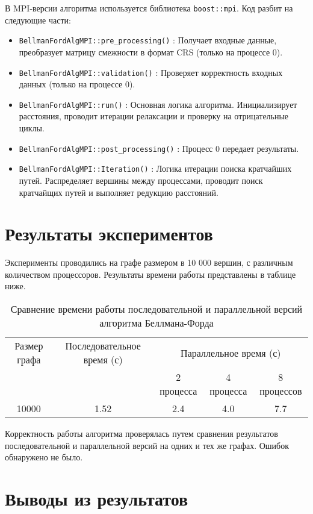 \documentclass[12pt]{article}
\begin{document}
В MPI-версии алгоритма используется библиотека \texttt{boost::mpi}. Код разбит на следующие части:
\begin{itemize}
    \item \texttt{BellmanFordAlgMPI::pre\_processing()} : Получает входные данные, преобразует матрицу смежности в формат CRS (только на процессе 0).
    \item \texttt{BellmanFordAlgMPI::validation()} : Проверяет корректность входных данных (только на процессе 0).
    \item \texttt{BellmanFordAlgMPI::run()} : Основная логика алгоритма. Инициализирует расстояния, проводит итерации релаксации и проверку на отрицательные циклы.
    \item \texttt{BellmanFordAlgMPI::post\_processing()} : Процесс 0 передает результаты.
    \item \texttt{BellmanFordAlgMPI::Iteration()} : Логика итерации поиска кратчайших путей. Распределяет вершины между процессами, проводит поиск кратчайщих путей и выполняет редукцию расстояний.
\end{itemize}

\newpage
\section*{Результаты экспериментов}

Эксперименты проводились на графе размером в 10 000 вершин, с различным количеством процессоров. Результаты времени работы представлены в таблице ниже.

\begin{table}[H]
    \centering
    \begin{tabular}{|c|c|c|c|c|}
    \hline
    Размер графа & Последовательное время (с) & \multicolumn{3}{c|}{Параллельное время (с)} \\
    \cline{3-5}
     &  & 2 процесса & 4 процесса & 8 процессов \\
    \hline
    10000 & 1.52 & 2.4 & 4.0 & 7.7 \\
    \hline
    \end{tabular}
    \caption{Сравнение времени работы последовательной и параллельной версий алгоритма Беллмана-Форда}
    \label{tab:time_results}
\end{table}


Корректность работы алгоритма проверялась путем сравнения результатов последовательной и параллельной версий на одних и тех же графах. Ошибок обнаружено не было.

\newpage
\section*{Выводы из результатов}
\end{document}
